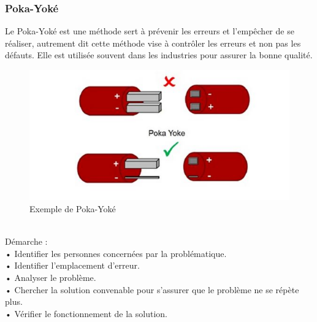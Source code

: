 \documentclass[12pt, a4paper]{thesis}
\begin{document}
\subsubsection{Poka-Yoké}
Le Poka-Yoké est une méthode sert à prévenir les erreurs et l’empêcher de se réaliser, autrement dit cette méthode vise à contrôler les erreurs et non pas les défauts. Elle est utilisée souvent dans les industries pour assurer la bonne qualité.\\
\begin{figure}[!h]
\begin{center}
        \includegraphics[scale=0.8]{poka.jpg}
        \caption{Exemple de Poka-Yoké}
\end{center}
\end{figure}\\
Démarche :\\
•	Identifier les personnes concernées par la problématique. \\
•	Identifier l’emplacement d’erreur.\\
•	Analyser le problème.\\
•	Chercher la solution convenable pour s’assurer que le problème ne se répète plus.\\
•	Vérifier le fonctionnement de la solution.\\
\end{document}
